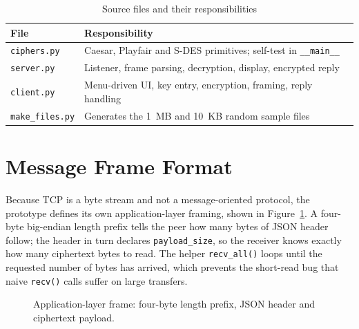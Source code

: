 \begin{table}[!ht]
\centering
\caption{Source files and their responsibilities}
\label{tab:modules}
\begin{tabular}{|l|l|}
\hline
\textbf{File} & \textbf{Responsibility} \\ \hline
\texttt{ciphers.py} & Caesar, Playfair and S-DES primitives; self-test in \texttt{\_\_main\_\_} \\ \hline
\texttt{server.py} & Listener, frame parsing, decryption, display, encrypted reply \\ \hline
\texttt{client.py} & Menu-driven UI, key entry, encryption, framing, reply handling \\ \hline
\texttt{make\_files.py} & Generates the 1~MB and 10~KB random sample files \\ \hline
\end{tabular}
\end{table}

\section{Message Frame Format}
Because TCP is a byte stream and not a message-oriented protocol, the prototype
defines its own application-layer framing, shown in Figure~\ref{fig:frame}. A
four-byte big-endian length prefix tells the peer how many bytes of JSON header
follow; the header in turn declares \texttt{payload\_size}, so the receiver knows
exactly how many ciphertext bytes to read. The helper \texttt{recv\_all()} loops
until the requested number of bytes has arrived, which prevents the short-read
bug that naive \texttt{recv()} calls suffer on large transfers.

\begin{figure}[!ht]
    \centering
    \caption{Application-layer frame: four-byte length prefix, JSON header and ciphertext payload.}
    \label{fig:frame}
\end{figure}

